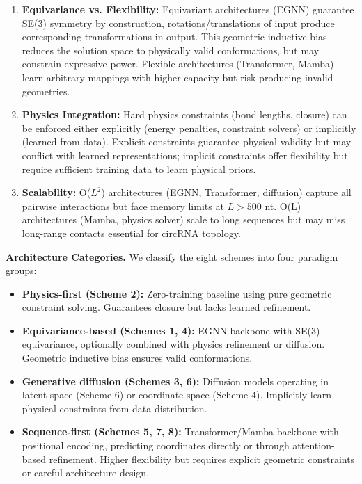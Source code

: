 \documentclass[12pt]{article}
\begin{document}
\begin{enumerate}
\item \textbf{Equivariance vs. Flexibility:} Equivariant architectures (EGNN) guarantee SE(3) symmetry by construction, rotations/translations of input produce corresponding transformations in output. This geometric inductive bias reduces the solution space to physically valid conformations, but may constrain expressive power. Flexible architectures (Transformer, Mamba) learn arbitrary mappings with higher capacity but risk producing invalid geometries.

\item \textbf{Physics Integration:} Hard physics constraints (bond lengths, closure) can be enforced either explicitly (energy penalties, constraint solvers) or implicitly (learned from data). Explicit constraints guarantee physical validity but may conflict with learned representations; implicit constraints offer flexibility but require sufficient training data to learn physical priors.

\item \textbf{Scalability:} O($L^2$) architectures (EGNN, Transformer, diffusion) capture all pairwise interactions but face memory limits at $L>500$ nt. O(L) architectures (Mamba, physics solver) scale to long sequences but may miss long-range contacts essential for circRNA topology.
\end{enumerate}

\textbf{Architecture Categories.} We classify the eight schemes into four paradigm groups:

\begin{itemize}
\item \textbf{Physics-first (Scheme 2):} Zero-training baseline using pure geometric constraint solving. Guarantees closure but lacks learned refinement.

\item \textbf{Equivariance-based (Schemes 1, 4):} EGNN backbone with SE(3) equivariance, optionally combined with physics refinement or diffusion. Geometric inductive bias ensures valid conformations.

\item \textbf{Generative diffusion (Schemes 3, 6):} Diffusion models operating in latent space (Scheme 6) or coordinate space (Scheme 4). Implicitly learn physical constraints from data distribution.

\item \textbf{Sequence-first (Schemes 5, 7, 8):} Transformer/Mamba backbone with positional encoding, predicting coordinates directly or through attention-based refinement. Higher flexibility but requires explicit geometric constraints or careful architecture design.
\end{itemize}
\end{document}
